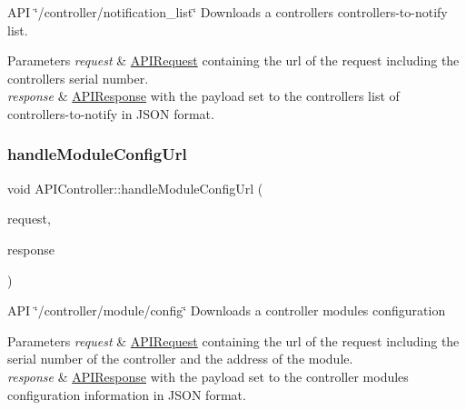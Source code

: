 A\+PI \char`\"{}/controller/notification\+\_\+list\char`\"{} Downloads a controller\textquotesingle{}s controllers-\/to-\/notify list. 
\begin{DoxyParams}{Parameters}
{\em request} & \hyperlink{class_a_p_i_request}{A\+P\+I\+Request} containing the url of the request including the controller\textquotesingle{}s serial number. \\
\hline
{\em response} & \hyperlink{class_a_p_i_response}{A\+P\+I\+Response} with the payload set to the controller\textquotesingle{}s list of controllers-\/to-\/notify in J\+S\+ON format. \\
\hline
\end{DoxyParams}
\mbox{\label{class_a_p_i_controller_a6274380cb71807d07d813b7e67e0c0c2}} 
\subsubsection{\texorpdfstring{handle\+Module\+Config\+Url}{handleModuleConfigUrl}}
{\footnotesize\ttfamily void A\+P\+I\+Controller\+::handle\+Module\+Config\+Url (\begin{DoxyParamCaption}\item[{const \hyperlink{class_a_p_i_request}{A\+P\+I\+Request} \&}]{request,  }\item[{\hyperlink{class_a_p_i_response}{A\+P\+I\+Response} $\ast$}]{response }\end{DoxyParamCaption})\hspace{0.3cm}{\ttfamily [slot]}}

A\+PI \char`\"{}/controller/module/config\char`\"{} Downloads a controller module\textquotesingle{}s configuration 
\begin{DoxyParams}{Parameters}
{\em request} & \hyperlink{class_a_p_i_request}{A\+P\+I\+Request} containing the url of the request including the serial number of the controller and the address of the module. \\
\hline
{\em response} & \hyperlink{class_a_p_i_response}{A\+P\+I\+Response} with the payload set to the controller module\textquotesingle{}s configuration information in J\+S\+ON format. \\
\hline
\end{DoxyParams}
\mbox{\label{class_a_p_i_controller_a9b2f08f4b0a67c0a4f6891a9d8601b93}} 
